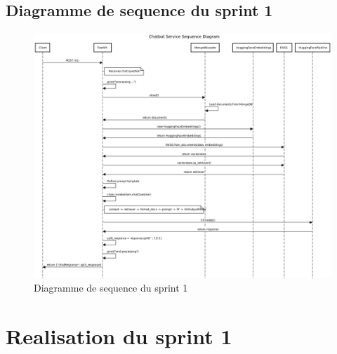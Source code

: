 \documentclass[a4paper, 11pt, openany]{report}
\begin{document}
\subsection{Diagramme de sequence du sprint 1}
\begin{figure}[H]
\centering
\includegraphics[width=1.2\textwidth]{chatbot-seq.png}
\caption{Diagramme de sequence du sprint 1}
\label{fig:sprint1_seq}
\end{figure}

\section{Realisation du sprint 1}
\end{document}

